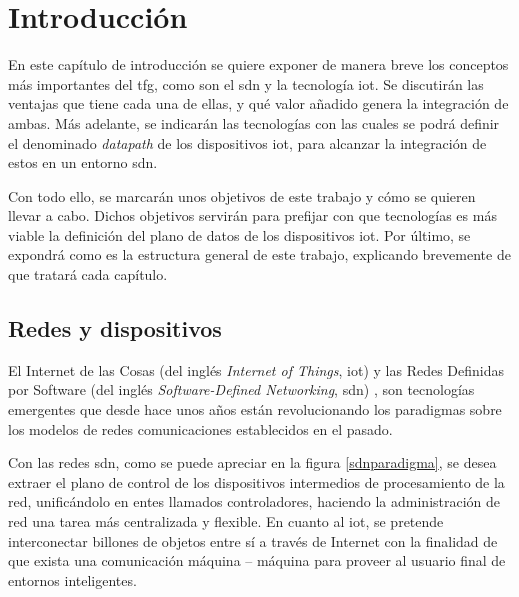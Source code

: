 
\chapter{Introducción}
\label{intro}

En este capítulo de introducción se quiere exponer de manera breve los conceptos más importantes del \gls{tfg}, como son el \gls{sdn} y la tecnología \gls{iot}. Se discutirán las ventajas que tiene cada una de ellas, y qué valor añadido genera la integración de ambas. Más adelante, se indicarán las tecnologías con las cuales se podrá definir el denominado \textit{datapath} de los dispositivos \gls{iot}, para alcanzar la integración de estos en un entorno \gls{sdn}.\\
\par
Con todo ello, se marcarán unos objetivos de este trabajo y cómo se quieren llevar a cabo. Dichos objetivos servirán para prefijar con que tecnologías es más viable la definición del plano de datos de los dispositivos \gls{iot}. Por último, se expondrá como es la estructura general de este trabajo, explicando brevemente de que tratará cada capítulo. 


\section{Redes  y dispositivos }

El Internet de las Cosas (del inglés \textit{Internet of Things}, \gls{iot}) \cite{iotreview} y las Redes Definidas por Software (del inglés \textit{Software-Defined Networking}, \gls{sdn}) \cite{nadeau2013sdn}, son tecnologías emergentes que desde hace unos años están revolucionando los paradigmas sobre los modelos de redes comunicaciones establecidos en el pasado. \\
\par

Con las redes \gls{sdn}, como se puede apreciar en la figura \ref{sdnparadigma}, se desea extraer el plano de control de los dispositivos intermedios de procesamiento de la red, unificándolo en entes llamados controladores, haciendo la administración de red una tarea más centralizada y flexible. En cuanto al \gls{iot}, se pretende interconectar billones de objetos entre sí a través de Internet con la finalidad de que exista una comunicación máquina – máquina para proveer al usuario final de entornos inteligentes. 

